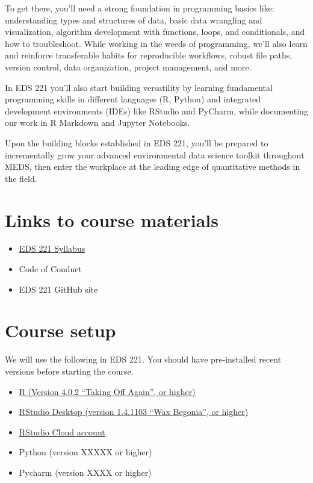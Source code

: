 \documentclass[
]{book}
\providecommand{\tightlist}{%
  \setlength{\itemsep}{0pt}\setlength{\parskip}{0pt}}
\begin{document}
To get there, you'll need a strong foundation in programming basics like: understanding types and structures of data, basic data wrangling and visualization, algorithm development with functions, loops, and conditionals, and how to troubleshoot. While working in the weeds of programming, we'll also learn and reinforce transferable habits for reproducible workflows, robust file paths, version control, data organization, project management, and more.

In EDS 221 you'll also start building versatility by learning fundamental programming skills in different languages (R, Python) and integrated development environments (IDEs) like RStudio and PyCharm, while documenting our work in R Markdown and Jupyter Notebooks.

Upon the building blocks established in EDS 221, you'll be prepared to incrementally grow your advanced environmental data science toolkit throughout MEDS, then enter the workplace at the leading edge of quantitative methods in the field.

\hypertarget{links-to-course-materials}{%
\section{Links to course materials}\label{links-to-course-materials}}

\begin{itemize}
\tightlist
\item
  \href{https://docs.google.com/document/d/1OGbc6U3STKdsThUKd9Nj5UgzeB7djgM130ku1UUH1gU/edit?usp=sharing}{EDS 221 Syllabus}
\item
  Code of Conduct
\item
  EDS 221 GitHub site
\end{itemize}

\hypertarget{course-setup}{%
\section{Course setup}\label{course-setup}}

We will use the following in EDS 221. You should have pre-installed recent versions before starting the course.

\begin{itemize}
\tightlist
\item
  \href{https://www.r-project.org/}{R (Version 4.0.2 ``Taking Off Again'', or higher)}
\item
  \href{https://rstudio.com/products/rstudio/}{RStudio Desktop (version 1.4.1103 ``Wax Begonia'', or higher)}
\item
  \href{https://rstudio.cloud/}{RStudio Cloud account}
\item
  Python (version XXXXX or higher)
\item
  Pycharm (version XXXX or higher)
\end{itemize}
\end{document}
